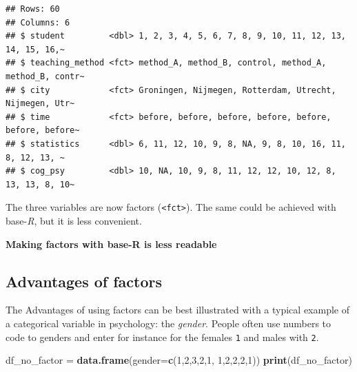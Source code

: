 \documentclass[
]{scrartcl}
\newenvironment{Shaded}{\begin{snugshade}}{\end{snugshade}}
\newcommand{\AttributeTok}[1]{\textcolor[rgb]{0.13,0.29,0.53}{#1}}
\newcommand{\DecValTok}[1]{\textcolor[rgb]{0.00,0.00,0.81}{#1}}
\newcommand{\FunctionTok}[1]{\textcolor[rgb]{0.13,0.29,0.53}{\textbf{#1}}}
\newcommand{\NormalTok}[1]{#1}
\newcommand{\OtherTok}[1]{\textcolor[rgb]{0.56,0.35,0.01}{#1}}
\newcommand{\SpecialCharTok}[1]{\textcolor[rgb]{0.81,0.36,0.00}{\textbf{#1}}}
\newenvironment{webexsolution}[1]
    {\par\tiny\textbf{#1}}
    {\par}
\newcommand{\webexhide}[1]{\begin{webexsolution}{#1}}
\newcommand{\webexunhide}{\end{webexsolution}}
\begin{document}
\begin{verbatim}
## Rows: 60
## Columns: 6
## $ student         <dbl> 1, 2, 3, 4, 5, 6, 7, 8, 9, 10, 11, 12, 13, 14, 15, 16,~
## $ teaching_method <fct> method_A, method_B, control, method_A, method_B, contr~
## $ city            <fct> Groningen, Nijmegen, Rotterdam, Utrecht, Nijmegen, Utr~
## $ time            <fct> before, before, before, before, before, before, before~
## $ statistics      <dbl> 6, 11, 12, 10, 9, 8, NA, 9, 8, 10, 16, 11, 8, 12, 13, ~
## $ cog_psy         <dbl> 10, NA, 10, 9, 8, 11, 12, 12, 10, 12, 8, 13, 13, 8, 10~
\end{verbatim}

The three variables are now factors (\texttt{\textless{}fct\textgreater{}}). The same could be achieved with base-\emph{R}, but it is less convenient.

\webexhide{Making factors with base-R is less readable}

\begin{Shaded}
\end{Shaded}

\webexunhide

\hypertarget{advantages-of-factors}{%
\subsection{Advantages of factors}\label{advantages-of-factors}}

The Advantages of using factors can be best illustrated with a typical example of a categorical variable in psychology: the \emph{gender}. People often use numbers to code to genders and enter for instance for the females \texttt{1} and males with \texttt{2}.

\begin{Shaded}
\begin{Highlighting}[]
\NormalTok{df\_no\_factor }\OtherTok{=} \FunctionTok{data.frame}\NormalTok{(}\AttributeTok{gender=}\FunctionTok{c}\NormalTok{(}\DecValTok{1}\NormalTok{,}\DecValTok{2}\NormalTok{,}\DecValTok{3}\NormalTok{,}\DecValTok{2}\NormalTok{,}\DecValTok{1}\NormalTok{, }\DecValTok{1}\NormalTok{,}\DecValTok{2}\NormalTok{,}\DecValTok{2}\NormalTok{,}\DecValTok{2}\NormalTok{,}\DecValTok{1}\NormalTok{))}
\FunctionTok{print}\NormalTok{(df\_no\_factor)}
\end{Highlighting}
\end{Shaded}
\end{document}
